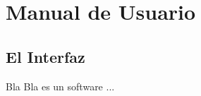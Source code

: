 \chapter{Manual de Usuario}
\label{chap:manual_de_usuario}

\section{El Interfaz}
\label{sec:interfaz}


Bla Bla es un software ...